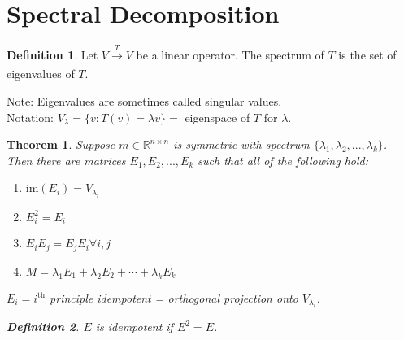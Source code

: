 \documentclass{report}
\theoremstyle{plain}
\newtheorem*{thrm}{Theorem}
\theoremstyle{definition}
\newtheorem*{defn}{Definition}
\theoremstyle{plain}
\begin{document}
\section{Spectral Decomposition}
\begin{defn}
Let $V\xrightarrow[]{T} V$ be a linear operator. The spectrum of $T$ is the set of eigenvalues of $T$.
\end{defn}
Note: Eigenvalues are sometimes called singular values.\\
Notation: $V_\lambda = \{v: T(v) = \lambda v\} =$ eigenspace of $T$ for $\lambda$.
\begin{thrm}
Suppose $m\in \mathbb{R}^{n\times n}$ is symmetric with spectrum $\{\lambda_1, \lambda_2, ..., \lambda_k\}$. Then there are matrices $E_1,E_2,...,E_k$ such that all of the following hold:
\begin{enumerate}
\item[(i)]$\mathrm{im}(E_i)=V_{\lambda_i}$
\item[(ii)]$E_i^2 = E_i$
\item[(iii)]$E_iE_j=E_jE_i \forall i,j$
\item[(iv)]$M=\lambda_1E_1+\lambda_2E_2+\cdots +\lambda_kE_k$
\end{enumerate}
$E_i = i^{\mathrm{th}}$ principle idempotent = orthogonal projection onto $V_{\lambda_i}$.
\begin{defn}
$E$ is idempotent if $E^2=E$.
\end{defn}
\end{thrm}
\end{document}
